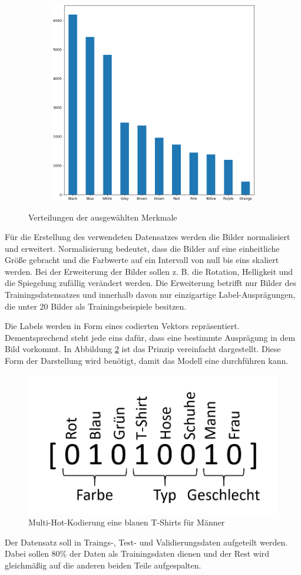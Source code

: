 \begin{figure}[H]
\begin{subfigure}[c]{0.32\linewidth}
	\end{subfigure}
	\begin{subfigure}[c]{0.32\linewidth}
		\includegraphics[width=\linewidth]{images/baseColour.png}
	\end{subfigure}
	\caption{Verteilungen der ausgewählten Merkmale}
	\label{fig:evaluation}
\end{figure}

Für die Erstellung des verwendeten Datensatzes werden die Bilder normalisiert und erweitert. Normalisierung bedeutet, dass die Bilder auf eine einheitliche Größe gebracht und die Farbwerte auf ein Intervall von null bis eins skaliert werden. Bei der Erweiterung der Bilder sollen z. B. die Rotation, Helligkeit und die Spiegelung zufällig verändert werden. Die Erweiterung betrifft nur Bilder des Trainingsdatensatzes und innerhalb davon nur einzigartige Label-Ausprägungen, die unter 20 Bilder als Trainingsbeispiele besitzen.

Die Labels werden in Form eines  codierten Vektors repräsentiert. Dementsprechend steht jede eins dafür, dass eine bestimmte Ausprägung in dem Bild vorkommt. In Abbildung \ref{fig:multihot} ist das Prinzip vereinfacht dargestellt. Diese Form der Darstellung wird benötigt, damit das Modell eine  durchführen kann.

\begin{figure}[H]
	\centering
	\includegraphics[width=0.3\linewidth]{images/MultiHotEncoding.png}
	\caption{Multi-Hot-Kodierung eine blauen T-Shirts für Männer}
	\label{fig:multihot}
\end{figure}

Der Datensatz soll in Traings-, Test- und Validierungsdaten aufgeteilt werden. Dabei sollen 80\% der Daten als Trainingsdaten dienen und der Rest wird gleichmäßig auf die anderen beiden Teile aufgespalten.